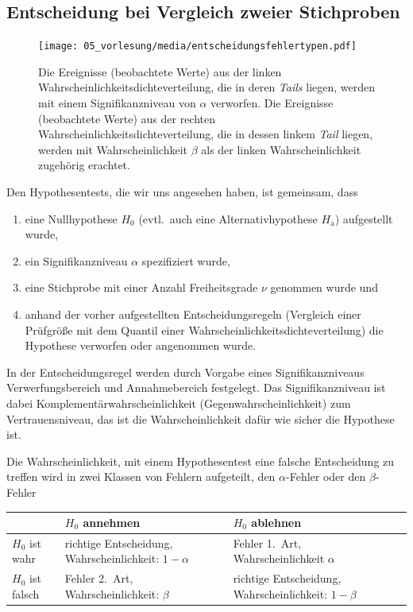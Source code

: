\subsection{Entscheidung bei Vergleich zweier Stichproben}
\begin{figure}
\begin{center}
\texttt{[image: 05\_vorlesung/media/entscheidungsfehlertypen.pdf]}
\caption{\label{entscheidungsfehler} Die Ereignisse (beobachtete Werte) aus der linken Wahrscheinlichkeitsdichteverteilung,
 die in deren \textsl{Tails} liegen, werden mit einem Signifikanzniveau von $\alpha$ verworfen.
 Die Ereignisse (beobachtete Werte) aus der rechten Wahrscheinlichkeitsdichteverteilung, die in dessen linkem
 \textsl{Tail} liegen, werden mit Wahrscheinlichkeit $\beta$ als der linken Wahrscheinlichkeit zugehörig
 erachtet.}
\end{center}
\end{figure}
Den Hypothesentests, die wir uns angesehen haben, ist gemeinsam, dass
\begin{enumerate}
\item eine Nullhypothese $H_0$ (evtl.\ auch eine Alternativhypothese $H_\mathrm{a}$)
aufgestellt wurde,
\item ein Signifikanzniveau $\alpha$ spezifiziert wurde,
\item eine Stichprobe mit einer Anzahl Freiheitsgrade $\nu$
genommen wurde und
\item anhand der vorher aufgestellten Entscheidungsregeln (Vergleich einer
Prüfgröße mit dem Quantil einer Wahrscheinlichkeitsdichteverteilung)
die Hypothese verworfen oder angenommen wurde.
\end{enumerate}
In der Entscheidungsregel werden durch Vorgabe eines Signifikanzniveaus Verwerfungsbereich
und Annahmebereich festgelegt. Das Signifikanzniveau ist dabei Komplementärwahrscheinlichkeit
(Gegenwahrscheinlichkeit) zum Vertrauensniveau, das ist die Wahrscheinlichkeit dafür
wie sicher die Hypothese ist.

Die Wahrscheinlichkeit, mit einem Hypothesentest eine falsche
Entscheidung zu treffen wird in zwei Klassen von Fehlern aufgeteilt, den
$\alpha$-Fehler oder den $\beta$-Fehler

\begin{center}
\begin{tabular}{M{3cm}|M{5.5cm}|M{5.5cm} N}
                 &     $H_0$ annehmen    &     $H_0$ ablehnen   \\[3pt]
\hline
$H_0$ ist wahr   & richtige Entscheidung, Wahrscheinlichkeit: $1-\alpha$ & Fehler 1.\ Art, Wahrscheinlichkeit $\alpha$ \\[3pt]
\hline
$H_0$ ist falsch & Fehler 2.\ Art, Wahrscheinlichkeit: $\beta$  & richtige Entscheidung, Wahrscheinlichkeit: $1-\beta$
\end{tabular}
\end{center}


